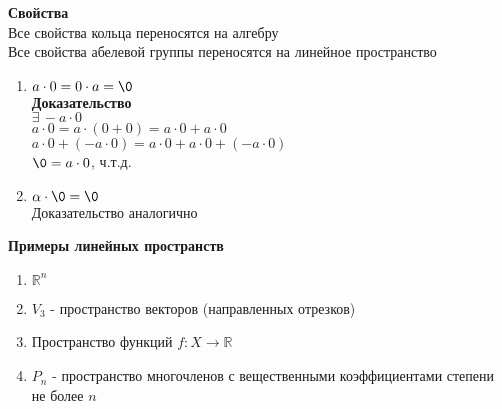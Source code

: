 \documentclass[12pt]{article}
\begin{document}
\textbf{Свойства}\\
Все свойства кольца переносятся на алгебру\\
Все свойства абелевой группы переносятся на линейное пространство
\begin{enumerate}
    \item $a\cdot 0 = 0\cdot a = \0$\\
    \textbf{Доказательство}\\
    $\exists\,-a\cdot 0$\\
    $a\cdot0=a\cdot(0+0)=a\cdot0+a\cdot 0$\\
    $a\cdot0+(-a\cdot0)=a\cdot0+a\cdot 0+(-a\cdot0)$\\
    $\0 = a\cdot0$, ч.т.д.
    \item $\alpha \cdot \0 = \0$\\
    Доказательство аналогично
\end{enumerate}
\textbf{Примеры линейных пространств}
\begin{enumerate}
    \item $\mathbb{R}^n$
    \item $V_3$ - пространство векторов (направленных отрезков)
    \item Пространство функций $f: X \rightarrow \mathbb{R}$
    \item $P_n$ - пространство многочленов с вещественными коэффициентами степени не более $n$
\end{enumerate}
\end{document}
